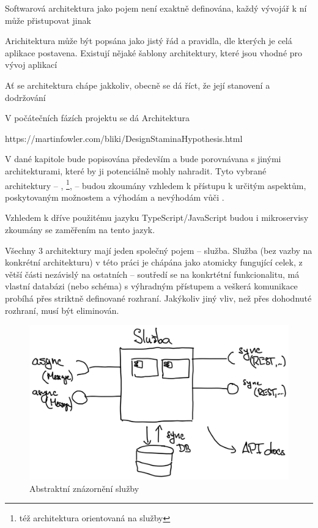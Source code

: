 

Softwarová architektura jako pojem není exaktně definována, každý vývojář k ní může přistupovat jinak  \cite{softarch}


Arichitektura může být popsána jako jistý řád a pravidla, dle kterých je celá aplikace postavena.
Existují nějaké šablony architektury, které jsou vhodné pro vývoj aplikací


Ať se architektura chápe jakkoliv, obecně se dá říct, že její stanovení a dodržování

V počátečních fázích projektu se dá
Architektura

https://martinfowler.com/bliki/DesignStaminaHypothesis.html


V dané kapitole bude popisována především  a bude porovnávana s jinými architekturami, které by ji potenciálně mohly nahradit.
Tyto vybrané architektury – , \footnote{též architektura orientovaná na služby},  – budou zkoumány vzhledem k přístupu k určitým aspektům, poskytovaným možnostem a výhodám a nevýhodám vůči .

Vzhledem k dříve použitému jazyku TypeScript/JavaScript budou i mikroservisy zkoumány se zaměřením na tento jazyk.


Všechny 3 architektury mají jeden společný pojem – služba.
Služba (bez vazby na konkrétní architekturu) v této práci je chápána jako atomicky fungující celek, z větší části nezávislý na ostatních – soutředí se na konkrtétní funkcionalitu, má vlastní databázi (nebo schéma) s výhradným přístupem a veškerá komunikace probíhá přes striktně definované rozhraní.
Jakýkoliv jiný vliv, než přes dohodnuté rozhraní, musí být eliminován.

\begin{figure}[htbp]
   \centering
   \includegraphics[max width=\textwidth]{assets/draft-service.png}
   \caption{Abstraktní znázornění služby}\label{pic:service-abstract}
\end{figure}

